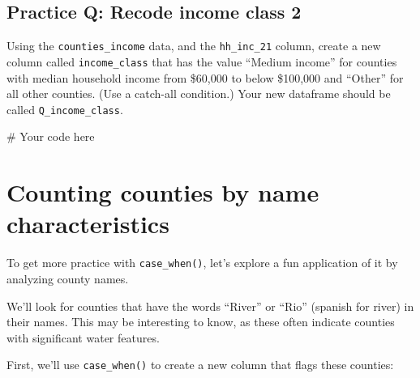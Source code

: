 \documentclass[
  letterpaper,
  DIV=11,
  numbers=noendperiod]{scrreprt}
\newenvironment{Shaded}{\begin{snugshade}}{\end{snugshade}}
\newcommand{\CommentTok}[1]{\textcolor[rgb]{0.37,0.37,0.37}{#1}}
\begin{document}
\begin{tcolorbox}[enhanced jigsaw, colframe=quarto-callout-tip-color-frame, opacityback=0, titlerule=0mm, bottomrule=.15mm, breakable, leftrule=.75mm, colbacktitle=quarto-callout-tip-color!10!white, title=\textcolor{quarto-callout-tip-color}{\faLightbulb}\hspace{0.5em}{Practice}, rightrule=.15mm, coltitle=black, opacitybacktitle=0.6, colback=white, left=2mm, arc=.35mm, toptitle=1mm, bottomtitle=1mm, toprule=.15mm]

\subsection{Practice Q: Recode income class
2}\label{practice-q-recode-income-class-2}

Using the \texttt{counties\_income} data, and the \texttt{hh\_inc\_21}
column, create a new column called \texttt{income\_class} that has the
value ``Medium income'' for counties with median household income from
\$60,000 to below \$100,000 and ``Other'' for all other counties. (Use a
catch-all condition.) Your new dataframe should be called
\texttt{Q\_income\_class}.

\begin{Shaded}
\begin{Highlighting}[]
\CommentTok{\# Your code here}
\end{Highlighting}
\end{Shaded}

\end{tcolorbox}

\section{Counting counties by name
characteristics}\label{counting-counties-by-name-characteristics}

To get more practice with \texttt{case\_when()}, let's explore a fun
application of it by analyzing county names.

We'll look for counties that have the words ``River'' or ``Rio''
(spanish for river) in their names. This may be interesting to know, as
these often indicate counties with significant water features.

First, we'll use \texttt{case\_when()} to create a new column that flags
these counties:
\end{document}
